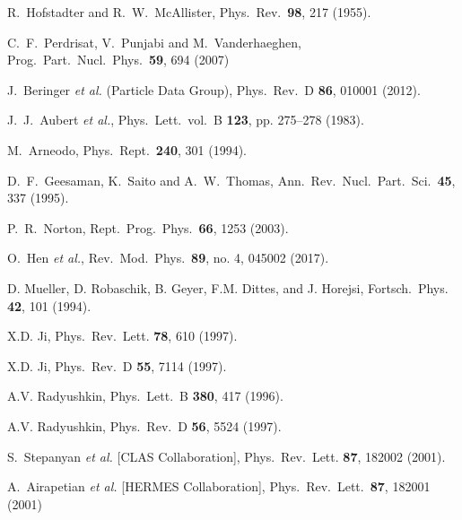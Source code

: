 \documentclass[twocolumn,nofootinbib,showpacs,prl,superscriptaddress,secnumarabic,amssymb,nobibnotes,aps,floatfix]{revtex4}
\begin{document}
\begin{thebibliography}{99}

 R.~Hofstadter and R.~W.~McAllister,
Phys.\ Rev.\  {\bf 98}, 217 (1955).

 C.~F.~Perdrisat, V.~Punjabi and M.~Vanderhaeghen,
Prog.\ Part.\ Nucl.\ Phys.\  {\bf 59}, 694 (2007)

 J.~Beringer {\it et al.} (Particle Data Group), Phys.\ Rev.\ D 
   {\bf 86}, 010001 (2012).

   J.~J.~Aubert {\it et al.}, 
      Phys.\ Lett.\, vol.\ B { \bf 123}, pp. 275–278 (1983).

  M.~Arneodo,
  Phys.\ Rept.\  {\bf 240}, 301 (1994).

  D.~F.~Geesaman, K.~Saito and A.~W.~Thomas,
  Ann.\ Rev.\ Nucl.\ Part.\ Sci.\  {\bf 45}, 337 (1995).

  P.~R.~Norton,
  Rept.\ Prog.\ Phys.\  {\bf 66}, 1253 (2003).

  O.~Hen {\it et al.},
  Rev.\ Mod.\ Phys.\  {\bf 89}, no. 4, 045002 (2017).

 D. Mueller, D. Robaschik, B. Geyer, F.M. Dittes, and 
   J.  Horejsi,
Fortsch.\ Phys. {\bf 42}, 101 (1994).
  
X.D. Ji,
Phys.\ Rev.\ Lett. {\bf 78}, 610 (1997).

X.D. Ji,
Phys.\ Rev.\ D {\bf 55}, 7114 (1997).

A.V. Radyushkin,
Phys.\ Lett.\  B {\bf 380}, 417 (1996).

A.V. Radyushkin,
Phys.\ Rev.\ D {\bf 56}, 5524 (1997).

S.~Stepanyan {\it et al.} [CLAS Collaboration],
Phys.\ Rev.\ Lett. {\bf 87}, 182002 (2001).

 A.~Airapetian {\it et al.} [HERMES Collaboration],
 Phys.\ Rev.\ Lett.\  {\bf 87}, 182001 (2001)


\end{thebibliography}
\end{document}
